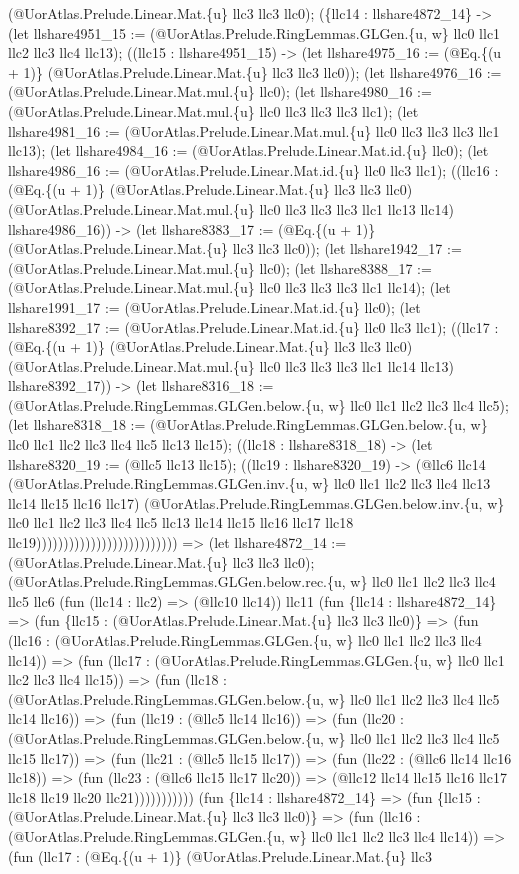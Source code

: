 \documentclass[11pt]{article}
\begin{document}
(@UorAtlas.Prelude.Linear.Mat.\{u\} llc3 llc3 llc0); (\{llc14 : llshare4872\_14\} -> (let llshare4951\_15 := (@UorAtlas.Prelude.RingLemmas.GLGen.\{u, w\} llc0 llc1 llc2 llc3 llc4 llc13); ((llc15 : llshare4951\_15) -> (let llshare4975\_16 := (@Eq.\{(u + 1)\} (@UorAtlas.Prelude.Linear.Mat.\{u\} llc3 llc3 llc0)); (let llshare4976\_16 := (@UorAtlas.Prelude.Linear.Mat.mul.\{u\} llc0); (let llshare4980\_16 := (@UorAtlas.Prelude.Linear.Mat.mul.\{u\} llc0 llc3 llc3 llc3 llc1); (let llshare4981\_16 := (@UorAtlas.Prelude.Linear.Mat.mul.\{u\} llc0 llc3 llc3 llc3 llc1 llc13); (let llshare4984\_16 := (@UorAtlas.Prelude.Linear.Mat.id.\{u\} llc0); (let llshare4986\_16 := (@UorAtlas.Prelude.Linear.Mat.id.\{u\} llc0 llc3 llc1); ((llc16 : (@Eq.\{(u + 1)\} (@UorAtlas.Prelude.Linear.Mat.\{u\} llc3 llc3 llc0) (@UorAtlas.Prelude.Linear.Mat.mul.\{u\} llc0 llc3 llc3 llc3 llc1 llc13 llc14) llshare4986\_16)) -> (let llshare8383\_17 := (@Eq.\{(u + 1)\} (@UorAtlas.Prelude.Linear.Mat.\{u\} llc3 llc3 llc0)); (let llshare1942\_17 := (@UorAtlas.Prelude.Linear.Mat.mul.\{u\} llc0); (let llshare8388\_17 := (@UorAtlas.Prelude.Linear.Mat.mul.\{u\} llc0 llc3 llc3 llc3 llc1 llc14); (let llshare1991\_17 := (@UorAtlas.Prelude.Linear.Mat.id.\{u\} llc0); (let llshare8392\_17 := (@UorAtlas.Prelude.Linear.Mat.id.\{u\} llc0 llc3 llc1); ((llc17 : (@Eq.\{(u + 1)\} (@UorAtlas.Prelude.Linear.Mat.\{u\} llc3 llc3 llc0) (@UorAtlas.Prelude.Linear.Mat.mul.\{u\} llc0 llc3 llc3 llc3 llc1 llc14 llc13) llshare8392\_17)) -> (let llshare8316\_18 := (@UorAtlas.Prelude.RingLemmas.GLGen.below.\{u, w\} llc0 llc1 llc2 llc3 llc4 llc5); (let llshare8318\_18 := (@UorAtlas.Prelude.RingLemmas.GLGen.below.\{u, w\} llc0 llc1 llc2 llc3 llc4 llc5 llc13 llc15); ((llc18 : llshare8318\_18) -> (let llshare8320\_19 := (@llc5 llc13 llc15); ((llc19 : llshare8320\_19) -> (@llc6 llc14 (@UorAtlas.Prelude.RingLemmas.GLGen.inv.\{u, w\} llc0 llc1 llc2 llc3 llc4 llc13 llc14 llc15 llc16 llc17) (@UorAtlas.Prelude.RingLemmas.GLGen.below.inv.\{u, w\} llc0 llc1 llc2 llc3 llc4 llc5 llc13 llc14 llc15 llc16 llc17 llc18 llc19)))))))))))))))))))))))))) => (let llshare4872\_14 := (@UorAtlas.Prelude.Linear.Mat.\{u\} llc3 llc3 llc0); (@UorAtlas.Prelude.RingLemmas.GLGen.below.rec.\{u, w\} llc0 llc1 llc2 llc3 llc4 llc5 llc6 (fun (llc14 : llc2) => (@llc10 llc14)) llc11 (fun \{llc14 : llshare4872\_14\} => (fun \{llc15 : (@UorAtlas.Prelude.Linear.Mat.\{u\} llc3 llc3 llc0)\} => (fun (llc16 : (@UorAtlas.Prelude.RingLemmas.GLGen.\{u, w\} llc0 llc1 llc2 llc3 llc4 llc14)) => (fun (llc17 : (@UorAtlas.Prelude.RingLemmas.GLGen.\{u, w\} llc0 llc1 llc2 llc3 llc4 llc15)) => (fun (llc18 : (@UorAtlas.Prelude.RingLemmas.GLGen.below.\{u, w\} llc0 llc1 llc2 llc3 llc4 llc5 llc14 llc16)) => (fun (llc19 : (@llc5 llc14 llc16)) => (fun (llc20 : (@UorAtlas.Prelude.RingLemmas.GLGen.below.\{u, w\} llc0 llc1 llc2 llc3 llc4 llc5 llc15 llc17)) => (fun (llc21 : (@llc5 llc15 llc17)) => (fun (llc22 : (@llc6 llc14 llc16 llc18)) => (fun (llc23 : (@llc6 llc15 llc17 llc20)) => (@llc12 llc14 llc15 llc16 llc17 llc18 llc19 llc20 llc21))))))))))) (fun \{llc14 : llshare4872\_14\} => (fun \{llc15 : (@UorAtlas.Prelude.Linear.Mat.\{u\} llc3 llc3 llc0)\} => (fun (llc16 : (@UorAtlas.Prelude.RingLemmas.GLGen.\{u, w\} llc0 llc1 llc2 llc3 llc4 llc14)) => (fun (llc17 : (@Eq.\{(u + 1)\} (@UorAtlas.Prelude.Linear.Mat.\{u\} llc3 
\end{document}
